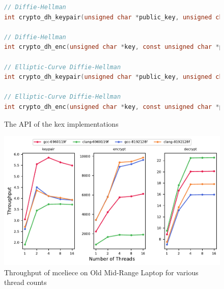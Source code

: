 \begin{figure}
    \centering
    \begin{lstlisting}[language=C]
// Diffie-Hellman
int crypto_dh_keypair(unsigned char *public_key, unsigned char *private_key, unsigned char *p, unsigned char *g);

// Diffie-Hellman
int crypto_dh_enc(unsigned char *key, const unsigned char *private_key, const unsigned char *public_key, unsigned char *p, unsigned char *g);

// Elliptic-Curve Diffie-Hellman
int crypto_dh_keypair(unsigned char *public_key, unsigned char *private_key);

// Elliptic-Curve Diffie-Hellman
int crypto_dh_enc(unsigned char *key, const unsigned char *private_key, const unsigned char *public_key);
    \end{lstlisting}
    \caption{The API of the \acrshort{kex} implementations}
    \label{figure:results:memory:kex-api}
\end{figure}

\begin{figure}
    \centering
    \includegraphics[scale=0.75]{chapters/results/throughput/Old Mid-Range Laptop_mceliece.pdf}
    \caption{Throughput of \gls{mceliece} on Old Mid-Range Laptop for various thread counts}
    \label{figure:results:throughput:mceliece-old-mid-range-laptop}
\end{figure}

